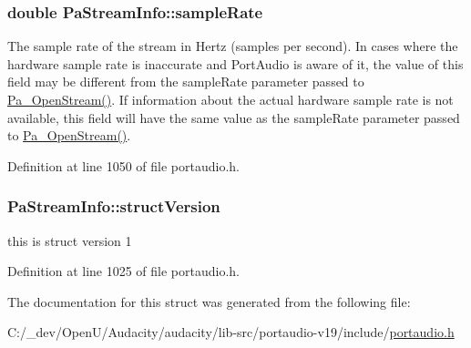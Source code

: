\subsubsection[{\texorpdfstring{sample\+Rate}{sampleRate}}]{\setlength{\rightskip}{0pt plus 5cm}double Pa\+Stream\+Info\+::sample\+Rate}\hypertarget{struct_pa_stream_info_a9200fdee790d9155bc35d03be51ee2dd}{}\label{struct_pa_stream_info_a9200fdee790d9155bc35d03be51ee2dd}
The sample rate of the stream in Hertz (samples per second). In cases where the hardware sample rate is inaccurate and Port\+Audio is aware of it, the value of this field may be different from the sample\+Rate parameter passed to \hyperlink{portaudio_8h_a443ad16338191af364e3be988014cbbe}{Pa\+\_\+\+Open\+Stream()}. If information about the actual hardware sample rate is not available, this field will have the same value as the sample\+Rate parameter passed to \hyperlink{portaudio_8h_a443ad16338191af364e3be988014cbbe}{Pa\+\_\+\+Open\+Stream()}. 

Definition at line 1050 of file portaudio.\+h.

\subsubsection[{\texorpdfstring{struct\+Version}{structVersion}}]{ Pa\+Stream\+Info\+::struct\+Version}\hypertarget{struct_pa_stream_info_a5e053a3f0f6232a5d1ec0dee0f9a943b}{}\label{struct_pa_stream_info_a5e053a3f0f6232a5d1ec0dee0f9a943b}
this is struct version 1 

Definition at line 1025 of file portaudio.\+h.



The documentation for this struct was generated from the following file\+:\begin{DoxyCompactItemize}
\item 
C\+:/\+\_\+dev/\+Open\+U/\+Audacity/audacity/lib-\/src/portaudio-\/v19/include/\hyperlink{portaudio_8h}{portaudio.\+h}\end{DoxyCompactItemize}
